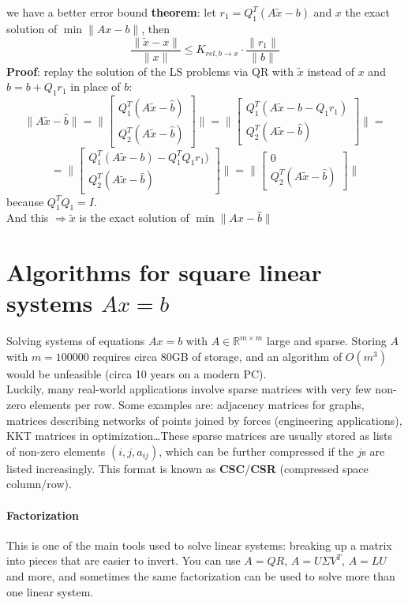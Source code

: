 \documentclass[10pt]{report}
\begin{document}
we have a better error bound \textbf{theorem}: let $r_1 = Q_1^T(A\tilde{x}-b)$ and $x$ the exact solution of $\min\|Ax-b\|$, then $$\frac{\|\tilde{x}-x\|}{\|x\|}\leq K_{rel, b\rightarrow x}\cdot\frac{\|r_1\|}{\|b\|}$$
\textbf{Proof}: replay the solution of the LS problems via QR with $\tilde{x}$ instead of $x$ and $\hat{b}=b+Q_1r_1$ in place of $b$: $$\|A\tilde{x}-\hat{b}\| = \|\left[\begin{array}{c}
Q_1^T(A\tilde{x}-\hat{b})\\Q_2^T(A\tilde{x}-\hat{b})
\end{array}\right]\|=\|\left[\begin{array}{c}
Q_1^T(A\tilde{x}-b-Q_1r_1)\\
Q_2^T(A\tilde{x}-\hat{b})
\end{array}\right]\|=$$
$$=\|\left[\begin{array}{c}
Q_1^T(A\tilde{x}-b)-Q_1^TQ_1r_1)\\
Q_2^T(A\tilde{x}-\hat{b})
\end{array}\right]\|=\|\left[\begin{array}{c}
0\\
Q_2^T(A\tilde{x}-\hat{b})
\end{array}\right]\|$$
because $Q_1^TQ_1=I$.\\
And this $\Rightarrow\tilde{x}$ is the exact solution of $\min\|Ax-\hat{b}\|$
\section{Algorithms for square linear systems $Ax=b$}
Solving systems of equations $Ax = b$ with $A\in\mathbb{R}^{m\times m}$ large and sparse. Storing $A$ with $m = 100000$ requires circa 80GB of storage, and an algorithm of $O(m^3)$would be unfeasible (circa 10 years on a modern PC).\\
Luckily, many real-world applications involve sparse matrices with very few non-zero elements per row. Some examples are: adjacency matrices for graphs, matrices describing networks of points joined by forces (engineering applications), KKT matrices in optimization\ldots These sparse matrices are usually stored as lists of non-zero elements $(i, j, a_{ij})$, which can be further compressed if the $j$s are listed increasingly. This format is known as \textbf{CSC}/\textbf{CSR} (compressed space column/row).
\paragraph{Factorization} This is one of the main tools used to solve linear systems: breaking up a matrix into pieces that are easier to invert. You can use $A=QR$, $A=U\Sigma V^T$, $A=LU$ and more, and sometimes the same factorization can be used to solve more than one linear system.
\end{document}
